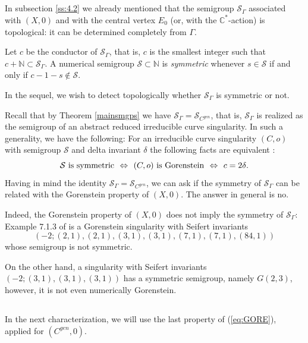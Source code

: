 \documentclass[12pt,a4paper]{amsart}
\def\cS{{\mathcal S}}
\theoremstyle{remark}
\theoremstyle{definition}
\begin{document}
\subsection{} In subsection \ref{ss:4.2} we already mentioned that the semigroup $\cS_{\Gamma}$ associated with $(X,0)$ and with  the central vertex $E_0$ (or, with the $\mathbb{C}^*$-action) 
is topological: it can be determined completely from $\Gamma$. 

Let $c$ be the conductor of $\cS_{\Gamma}$, that is, $c$ is the smallest integer such that 
$c+\mathbb{N}\subset \cS_\Gamma$. A numerical semigroup $\cS\subset \mathbb{N}$ is {\it symmetric}
whenever  $s\in \cS$ if and only if $c-1-s\not\in\cS$. 

In the sequel, we wish to detect topologically whether $\cS_\Gamma$ is symmetric or not.

Recall that by Theorem \ref{mainsmgps} we have $\cS_\Gamma=\cS_{C^{gen}}$, that is, $\cS_\Gamma$
is realized as the semigroup of an abstract reduced irreducible curve singularity. 
In such a generality, we have the following: For an irreducible curve singularity $(C,o)$ with semigroup $\cS$  and delta invariant $\delta$ the following facts are equivalent \cite{Kunz, Delgado}:
\begin{equation}\label{eq:GORE} \mbox{$\cS$ is symmetric \ $\Leftrightarrow$ \ $(C,o)$ is Gorenstein  \ $\Leftrightarrow$ \
$c=2\delta$}. \end{equation}
Having in mind the identity  $\cS_\Gamma=\cS_{C^{gen}}$, we can ask if the symmetry of $\cS_\Gamma$ can be related with the Gorenstein property of $(X,0)$. The answer in general is no.

Indeed, the Gorenstein property of $(X,0)$ does not imply the symmetry of $\cS_\Gamma$: 
 Example 7.1.3 of \cite{stronglyflat} 
 is a Gorenstein singularity with Seifert invariants $$(-2; (2,1), (2,1), (3,1),(3,1), (7,1), (7,1), (84,1))$$ whose semigroup is not symmetric. 

On the other hand, a singularity with Seifert invariants $(-2; (3,1), (3,1), (3,1))$
 has a symmetric semigroup, namely $G(2,3)$, however, it is not even  numerically Gorenstein. 

\subsection{} In the next characterization, we will use the last property of (\ref{eq:GORE}), 
applied for $(C^{gen},0)$.
\end{document}
